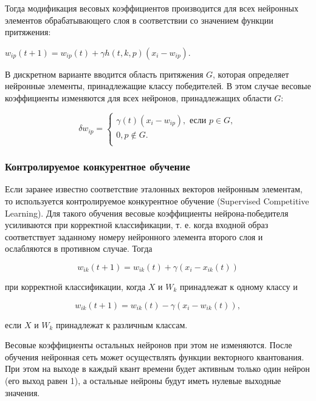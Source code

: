 \documentclass[bachelor, och, referat]{template}
\begin{document}
Тогда модификация весовых коэффициентов производится для всех
нейронных элементов обрабатывающего слоя в соответствии со 
значением функции притяжения:

\begin{center}
    $w_{ip}(t + 1) = w_{ip}(t) + \gamma h(t, k, p)(x_i - w_{ip})$.
\end{center}

В дискретном варианте вводится область притяжения $G$, которая
определяет нейронные элементы, принадлежащие классу победителей.
В этом случае весовые коэффициенты изменяются для всех нейронов,
принадлежащих области $G$:

\begin{equation*}
    \delta w_{ip} = 
    \begin{cases}
        \gamma(t)(x_i - w_{ip}), \text{ если } p \in G, \\
        0, p \notin G. \\
    \end{cases}
\end{equation*}


\subsubsection{Контролируемое конкурентное обучение}

Если заранее известно соответствие эталонных векторов нейронным
элементам, то используется контролируемое конкурентное обучение (Supervised 
Competitive Learning). Для такого обучения весовые коэффициенты 
нейрона-победителя усиливаются при корректной классификации, т. е.
когда входной образ соответствует заданному номеру нейронного элемента
второго слоя и ослабляются в противном случае. Тогда

\begin{equation*}
    w_{ik}(t + 1) = w_{ik}(t) + \gamma(x_i - x_{ik}(t))
\end{equation*}

при корректной классификации, когда $X$ и $W_k$ принадлежат к одному
классу и

\begin{equation*}
    w_{ik}(t + 1) = w_{ik}(t) - \gamma(x_i - w_{ik}(t)),
\end{equation*}

если $X$ и $W_k$ принадлежат к различным классам.

Весовые коэффициенты остальных нейронов при этом не изменяются. 
После обучения нейронная сеть может осуществлять функции
векторного квантования. При этом на выходе в каждый квант времени
будет активным только один нейрон (его выход равен 1), а остальные
нейроны будут иметь нулевые выходные значения.
\end{document}
